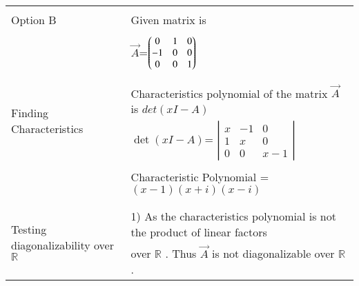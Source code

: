 \documentclass[journal,12pt]{IEEEtran}
\begin{document}
\begin{longtable}{|l|l|}
\hline \hline
\multirow{3}{*}{Option B} & \\
& Given matrix is  \\
&\\
& $\vec{A}$=$\begin{pmatrix}0&1&0\\-1&0&0\\0&0&1\end{pmatrix}$\\
&\\
\hline
\multirow{3}{*}{Finding Characteristics} & \\
&
Characteristics polynomial of the matrix $\vec{A}$ is $det(xI-A)$\\ 
polynomial
& $\det(xI-A)$= $\left|
                \begin{array}{ccc}
                x & -1 & 0\\
                1 & x & 0\\
                0 & 0 & x-1
                \end{array} \right|$  \\
&\\
& Characteristic Polynomial = $(x-1)(x+i)(x-i)$\\
&\\
\hline
\multirow{3}{*}{Testing diagonalizability over $\mathbb{R}$} & \\
& 1) As the characteristics  polynomial is not the product of linear factors\\
&over $\mathbb{R}$ . Thus $\vec{A}$ is not diagonalizable over $\mathbb{R}$.\\


\end{longtable}
\end{document}
